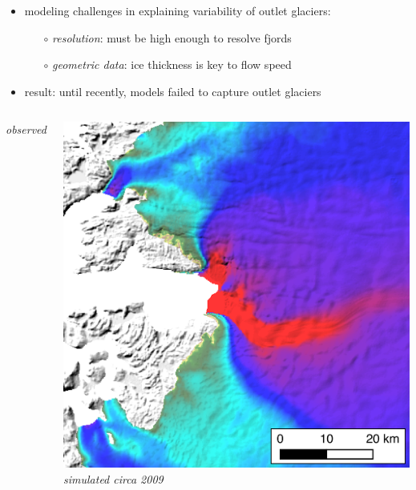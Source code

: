 \documentclass[hide notes,intlimits]{beamer}
\begin{document}
\begin{frame}[plain]

\begin{itemize}
\item modeling challenges in explaining variability of outlet glaciers:
      \begin{itemize}
      \item[$\circ$] \emph{resolution}:  must be high enough to resolve fjords
      \item[$\circ$] \emph{geometric data}: ice thickness is key to flow speed
      \end{itemize}
\item result: until recently, models failed to capture outlet glaciers
\end{itemize}

\bigskip

  \begin{columns}
    \column[c]{5cm}
    \emph{observed}

\medskip
    \includegraphics[width=\textwidth]{jakobshavn-obs-nogate}
    \column[c]{5cm}
    \emph{simulated circa 2009}


\end{columns}
\end{frame}
\end{document}
